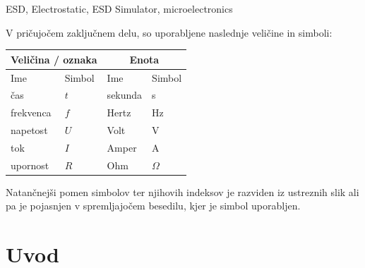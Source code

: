 \documentclass[a4paper,twoside,openright,12pt,Slovene]{book}
\begin{document}
\keywords
ESD, Electrostatic, ESD Simulator, microelectronics


\tableofcontents

\seznamslik
\seznamtabel

\seznamsimbolov
V pričujočem zaključnem delu, so uporabljene naslednje veličine in simboli:

\begin{center}
    \begin{tabular}{*{4}{l}} \hline
        \multicolumn{2}{c}{\bf{Veličina / oznaka}}           & \multicolumn{2}{c}{\bf{Enota}} \\ \hline
        Ime                & Simbol                          & Ime      & Simbol              \\ \hline
        čas                & $t$                             & sekunda  & s                   \\
        frekvenca          & $f$                             & Hertz    & Hz                  \\
        napetost           & $U$                             & Volt     & V                  \\
        tok                & $I$                             & Amper    & A                   \\
        upornost           & $R$                             & Ohm      & $\Omega$            \\ \hline

    \end{tabular}
\end{center}

Natančnejši pomen simbolov ter njihovih indeksov je razviden iz ustreznih slik ali pa je pojasnjen v spremljajočem besedilu, kjer je simbol uporabljen.

\mainmatter

\chapter{Uvod} \label{uvod}
\end{document}
